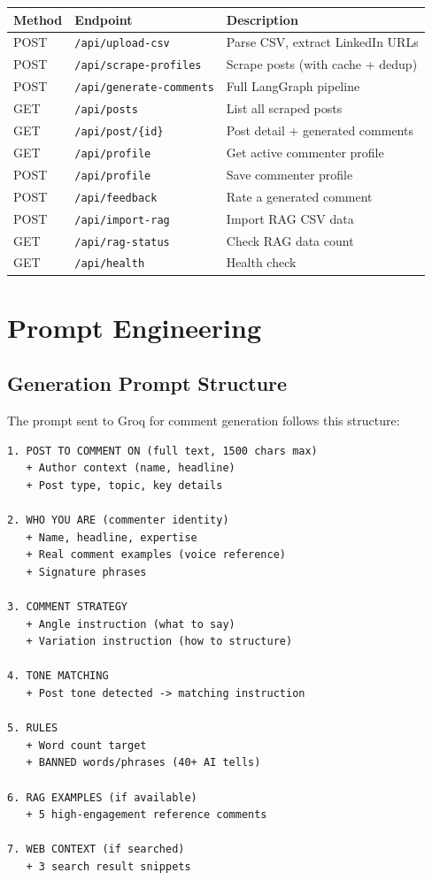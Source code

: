 \documentclass[12pt,a4paper]{article}
\begin{document}
\begin{center}
\small
\begin{tabularx}{\textwidth}{llX}
\toprule
\textbf{Method} & \textbf{Endpoint} & \textbf{Description} \\
\midrule
POST & \texttt{/api/upload-csv} & Parse CSV, extract LinkedIn URLs \\
POST & \texttt{/api/scrape-profiles} & Scrape posts (with cache + dedup) \\
POST & \texttt{/api/generate-comments} & Full LangGraph pipeline \\
GET & \texttt{/api/posts} & List all scraped posts \\
GET & \texttt{/api/post/\{id\}} & Post detail + generated comments \\
GET & \texttt{/api/profile} & Get active commenter profile \\
POST & \texttt{/api/profile} & Save commenter profile \\
POST & \texttt{/api/feedback} & Rate a generated comment \\
POST & \texttt{/api/import-rag} & Import RAG CSV data \\
GET & \texttt{/api/rag-status} & Check RAG data count \\
GET & \texttt{/api/health} & Health check \\
\bottomrule
\end{tabularx}
\end{center}

\section{Prompt Engineering}

\subsection{Generation Prompt Structure}

The prompt sent to Groq for comment generation follows this structure:

\begin{lstlisting}
1. POST TO COMMENT ON (full text, 1500 chars max)
   + Author context (name, headline)
   + Post type, topic, key details

2. WHO YOU ARE (commenter identity)
   + Name, headline, expertise
   + Real comment examples (voice reference)
   + Signature phrases

3. COMMENT STRATEGY
   + Angle instruction (what to say)
   + Variation instruction (how to structure)

4. TONE MATCHING
   + Post tone detected -> matching instruction

5. RULES
   + Word count target
   + BANNED words/phrases (40+ AI tells)

6. RAG EXAMPLES (if available)
   + 5 high-engagement reference comments

7. WEB CONTEXT (if searched)
   + 3 search result snippets
\end{lstlisting}
\end{document}

